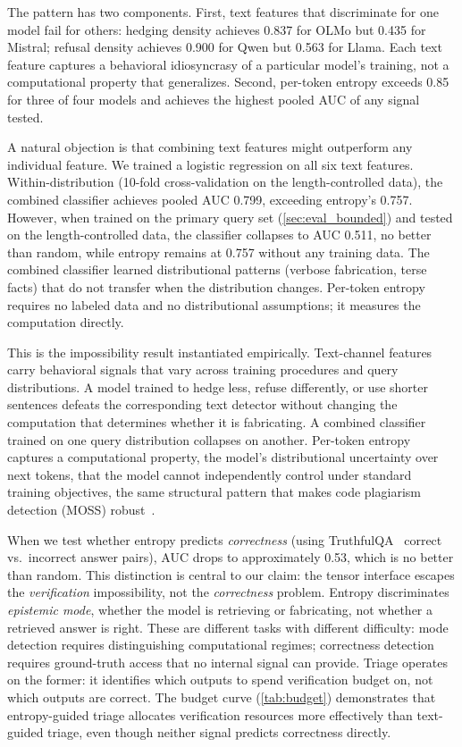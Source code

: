 The pattern has two components. First, text features that discriminate for
one model fail for others: hedging density achieves 0.837 for OLMo but
0.435 for Mistral; refusal density achieves 0.900 for Qwen but 0.563 for
Llama. Each text feature captures a behavioral idiosyncrasy of a
particular model's training, not a computational property that generalizes.
Second, per-token entropy exceeds 0.85 for three of four models and achieves
the highest pooled AUC of any signal tested.

A natural objection is that combining text features might outperform any
individual feature. We trained a logistic regression on all six text features.
Within-distribution (10-fold cross-validation on the length-controlled data),
the combined classifier achieves pooled AUC 0.799, exceeding entropy's 0.757.
However, when trained on the primary query set (\autoref{sec:eval_bounded}) and
tested on the length-controlled data, the classifier collapses to AUC
0.511, no better than random, while entropy remains at 0.757 without any
training data. The combined classifier learned distributional patterns (verbose
fabrication, terse facts) that do not transfer when the distribution changes.
Per-token entropy requires no labeled data and no distributional assumptions;
it measures the computation directly.

This is the impossibility result instantiated empirically. Text-channel
features carry behavioral signals that vary across training procedures and
query distributions. A model trained to hedge less, refuse differently, or
use shorter sentences defeats the corresponding text detector without changing
the computation that determines whether it is fabricating. A combined
classifier trained on one query distribution collapses on another.
Per-token entropy captures a
computational property, the model's distributional uncertainty over next
tokens, that the model cannot independently control under standard training
objectives, the same structural pattern that makes code plagiarism detection
(MOSS) robust~\cite{aiken_moss, schleimer2003winnowing}.

When we test whether entropy predicts \emph{correctness} (using
TruthfulQA~\cite{lin2022truthfulqa} correct vs.\ incorrect answer pairs), AUC
drops to approximately 0.53, which is no better than random. This distinction
is central to our claim: the tensor interface escapes the \emph{verification}
impossibility, not the \emph{correctness} problem. Entropy discriminates
\emph{epistemic mode}, whether the model is retrieving or fabricating, not
whether a retrieved answer is right. These are different tasks with different
difficulty: mode detection requires distinguishing computational regimes;
correctness detection requires ground-truth access that no internal signal can
provide. Triage operates on the former: it identifies which outputs to spend
verification budget on, not which outputs are correct. The budget curve
(\autoref{tab:budget}) demonstrates that entropy-guided triage allocates
verification resources more effectively than text-guided triage, even though
neither signal predicts correctness directly.

